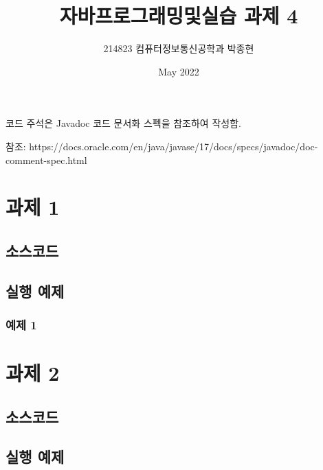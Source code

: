 \documentclass{article}
\title{자바프로그래밍및실습 과제 4}
\author{214823 컴퓨터정보통신공학과 박종현}
\date{May 2022}
\theoremstyle{nonumberplain}
\begin{document}
\maketitle
\pagebreak


코드 주석은 Javadoc 코드 문서화 스펙을 참조하여 작성함.

참조: https://docs.oracle.com/en/java/javase/17/docs/specs/javadoc/doc-comment-spec.html


\section{과제 1}
\subsection{소스코드}


\subsection{실행 예제}
\subsubsection{예제 1}



\section{과제 2}
\subsection{소스코드}


\subsection{실행 예제}
\end{document}
